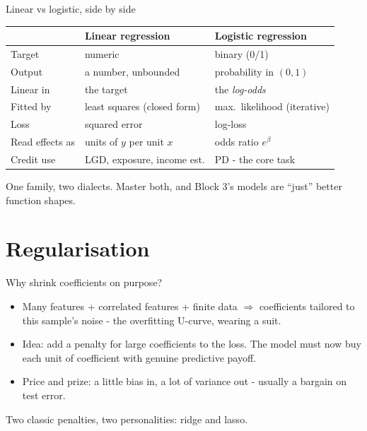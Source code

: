 \documentclass[10pt,aspectratio=169]{beamer}
\begin{document}
\begin{frame}{Linear vs logistic, side by side}
  \small
  \begin{center}
  \begin{tabular}{@{}lll@{}}
    \toprule
     & Linear regression & Logistic regression \\
    \midrule
    Target & numeric & binary (0/1) \\
    Output & a number, unbounded & probability in $(0,1)$ \\
    Linear in & the target & the \emph{log-odds} \\
    Fitted by & least squares (closed form) & max.\ likelihood (iterative) \\
    Loss & squared error & log-loss \\
    Read effects as & units of $y$ per unit $x$ & odds ratio $e^{\beta}$ \\
    Credit use & LGD, exposure, income est. & \alert{PD - the core task} \\
    \bottomrule
  \end{tabular}
  \end{center}
  \vspace{0.5em}
  \begin{center}
    One family, two dialects. Master both, and Block 3's models are
    ``just'' better function shapes.
  \end{center}
\end{frame}

\section{Regularisation}

\begin{frame}{Why shrink coefficients on purpose?}
  \begin{itemize}
    \item Many features + correlated features + finite data $\Rightarrow$
          coefficients tailored to \alert{this sample's noise} -
          the overfitting U-curve, wearing a suit.
    \item Idea: add a \alert{penalty for large coefficients} to the loss.
          The model must now buy each unit of coefficient with genuine
          predictive payoff.
    \item Price and prize: a little bias in, a lot of variance out -
          usually a bargain on test error.
  \end{itemize}
  \vspace{0.5em}
  \begin{center}
    Two classic penalties, two personalities: ridge and lasso.
  \end{center}
\end{frame}
\end{document}
